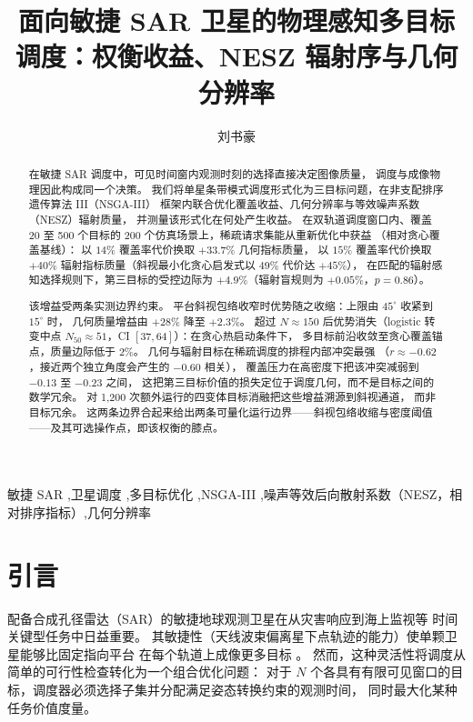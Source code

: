 \documentclass[preprint,12pt,authoryear]{elsarticle}
\begin{document}
\begin{frontmatter}
\title{面向敏捷 SAR 卫星的物理感知多目标调度：权衡收益、NESZ 辐射序与几何分辨率}
\author{刘书豪}
\begin{abstract}
在敏捷 SAR 调度中，可见时间窗内观测时刻的选择直接决定图像质量，
调度与成像物理因此构成同一个决策。
我们将单星条带模式调度形式化为三目标问题，在非支配排序遗传算法 III（NSGA-III）
框架内联合优化覆盖收益、几何分辨率与等效噪声系数（NESZ）辐射质量，
并测量该形式化在何处产生收益。
在双轨道调度窗口内、覆盖 20 至 500 个目标的 200 个仿真场景上，稀疏请求集能从重新优化中获益
（相对贪心覆盖基线）：
以 $14\%$ 覆盖率代价换取 $+33.7\%$ 几何指标质量，
以 $15\%$ 覆盖率代价换取 $+40\%$ 辐射指标质量（斜视最小化贪心启发式以 $49\%$ 代价达 $+45\%$），
在匹配的辐射感知选择规则下，第三目标的受控边际为 $+4.9\%$（辐射盲规则为 $+0.05\%$，$p=0.86$）。

该增益受两条实测边界约束。
平台斜视包络收窄时优势随之收缩：上限由 $45^\circ$ 收紧到 $15^\circ$ 时，
几何质量增益由 $+28\%$ 降至 $+2.3\%$。
超过 $N \approx 150$ 后优势消失（logistic 转变中点 $N_{50} \approx 51$，CI $[37, 64]$）：在贪心热启动条件下，
多目标前沿收敛至贪心覆盖锚点，质量边际低于 $2\%$。
几何与辐射目标在稀疏调度的排程内部冲突最强
（$r \approx -0.62$，接近两个独立角度会产生的 $-0.60$ 相关），
覆盖压力在高密度下把该冲突减弱到 $-0.13$ 至 $-0.23$ 之间，
这把第三目标价值的损失定位于调度几何，而不是目标之间的数学冗余。
对 1{,}200 次额外运行的四变体目标消融把这些增益溯源到斜视通道，
而非目标冗余。
这两条边界合起来给出两条可量化运行边界——斜视包络收缩与密度阈值——及其可选操作点，即该权衡的膝点。
\end{abstract}
\begin{keyword}
敏捷 SAR \sep 卫星调度 \sep 多目标优化 \sep NSGA-III \sep 噪声等效后向散射系数（NESZ，相对排序指标）\sep 几何分辨率
\end{keyword}
\end{frontmatter}
\section{引言}
\label{sec:introduction}
配备合成孔径雷达（SAR）的敏捷地球观测卫星在从灾害响应到海上监视等
时间关键型任务中日益重要。
其敏捷性（天线波束偏离星下点轨迹的能力）使单颗卫星能够比固定指向平台
在每个轨道上成像更多目标 \citep{Curlander1991}。
然而，这种灵活性将调度从简单的可行性检查转化为一个组合优化问题：
对于 $N$ 个各具有有限可见窗口的目标，调度器必须选择子集并分配满足姿态转换约束的观测时间，
同时最大化某种任务价值度量。
\end{document}

